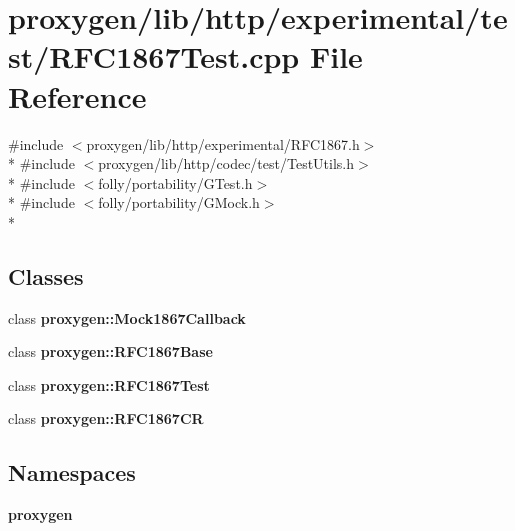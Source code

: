 \section{proxygen/lib/http/experimental/test/\+R\+F\+C1867\+Test.cpp File Reference}
\label{RFC1867Test_8cpp}
{\ttfamily \#include $<$proxygen/lib/http/experimental/\+R\+F\+C1867.\+h$>$}\\*
{\ttfamily \#include $<$proxygen/lib/http/codec/test/\+Test\+Utils.\+h$>$}\\*
{\ttfamily \#include $<$folly/portability/\+G\+Test.\+h$>$}\\*
{\ttfamily \#include $<$folly/portability/\+G\+Mock.\+h$>$}\\*
\subsection*{Classes}
\begin{DoxyCompactItemize}
\item 
class {\bf proxygen\+::\+Mock1867\+Callback}
\item 
class {\bf proxygen\+::\+R\+F\+C1867\+Base}
\item 
class {\bf proxygen\+::\+R\+F\+C1867\+Test}
\item 
class {\bf proxygen\+::\+R\+F\+C1867\+CR}
\end{DoxyCompactItemize}
\subsection*{Namespaces}
\begin{DoxyCompactItemize}
\item 
 {\bf proxygen}
\end{DoxyCompactItemize}

